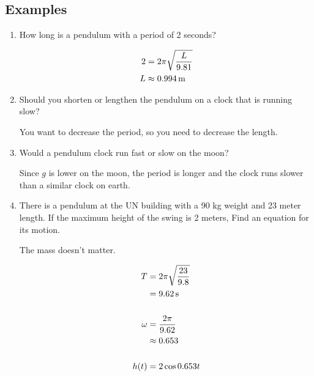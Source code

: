 \documentclass{exam}
\begin{document}
  \subsection{Examples}
  \begin{enumerate}
    \item How long is a pendulum with a period of 2 seconds?
      \begin{solution}
        \begin{align*}
          2 & = 2 \pi \sqrt{\frac{L}{9.81}} \\
          L & \approx \unit[0.994]{m} \\
        \end{align*}
      \end{solution}

    \item Should you shorten or lengthen the pendulum on a clock that is running slow?
      \begin{solution}
        You want to decrease the period, so you need to decrease the length.
      \end{solution}

    \item Would a pendulum clock run fast or slow on the moon?
      \begin{solution}
        Since $g$ is lower on the moon, the period is longer and the clock runs slower than a similar clock on earth.
      \end{solution}

    \item There is a pendulum at the UN building with a 90 kg weight and 23 meter length.  If the maximum height of the
      swing is 2 meters, Find an equation for its motion.

      \begin{solution}
        The mass doesn't matter.

        \begin{align*}
          T      & = 2 \pi \sqrt{\frac{23}{9.8}} \\
                 & = \unit[9.62]{s} \\
            \\
          \omega & = \frac{2 \pi}{9.62} \\
                 & \approx 0.653 \\
            \\
          h(t)   & = 2 \cos 0.653 t \\
        \end{align*}
      \end{solution}
  \end{enumerate}
\end{document}
